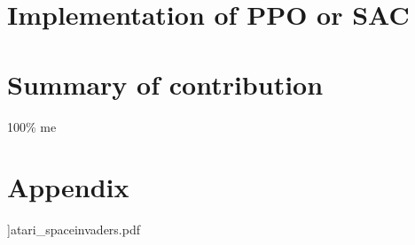 \documentclass[a4pape, 11pt, english]{article}
\begin{document}
\section{Implementation of PPO or SAC}

\section{Summary of contribution}
100\% me



\section{Appendix}


]{atari_spaceinvaders.pdf}


%












\end{document}
